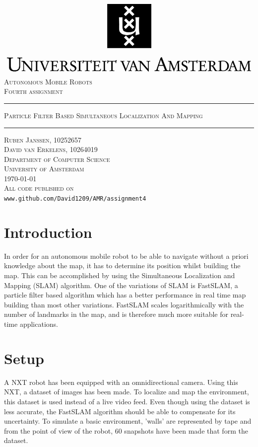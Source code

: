 \documentclass[12pt]{article}
\begin{document}
\begin{titlepage}
\begin{center}
    \includegraphics[width=\textwidth]{./logo.png}
    \\ [2.5cm]
    \textsc{\Large Autonomous Mobile Robots}
    \\ [0.5cm]
    \textsc{\large Fourth assignment}
    \\ [1cm]
    \hrule
    \vspace{0.3cm}
    \textsc{Particle Filter Based Simultaneous Localization And Mapping}
    \\ [0.3cm]
    \hrule
    \vfill
    \textsc{Ruben Janssen, 10252657 \\ David van Erkelens, 10264019 \\[0.7cm] Department of Computer Science \\ University of Amsterdam \\[0.3cm] \today \\[0.5cm] All code published on}
    \\
    \verb|www.github.com/David1209/AMR/assignment4|
\end{center}
\end{titlepage}
\tableofcontents
\clearpage
\section{Introduction}
In order for an autonomous mobile robot to be able to navigate without a priori knowledge about the map, it has to determine its position whilst building the map. This can be accomplished by using the Simultaneous Localization and Mapping (SLAM) algorithm. One of the variations of SLAM is FastSLAM, a particle filter based algorithm which has a better performance in real time map building than most other variations. FastSLAM scales logarithmically with the number of landmarks in the map, and is therefore much more suitable for real-time applications.

\section{Setup}
A NXT robot has been equipped with an omnidirectional camera. Using this NXT, a dataset of images has been made. To localize and map the environment, this dataset is used instead of a live video feed. Even though using the dataset is less accurate, the FastSLAM algorithm should be able to compensate for its uncertainty. To simulate a basic environment, 'walls' are represented by tape and from the point of view of the robot, 60 snapshots have been made that form the dataset. 
\end{document}

